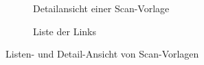 \documentclass[nomenclature, oneside, 150]{HSMW-Thesis}
\begin{document}
\begin{figure}[th]
\begin{subfigure}[t]{0.3\textwidth}
        			\caption{Detailansicht einer Scan-Vorlage}
        			\label{fig:liste2}
    			\end{subfigure}
    			\begin{subfigure}[t]{0.3\textwidth}
        			\caption{Liste der Links}
        			\label{fig:liste3}
    			\end{subfigure}
    			\caption{Listen- und Detail-Ansicht von Scan-Vorlagen}
				\label{fig:vorlagen}
			\end{figure}
\end{document}
